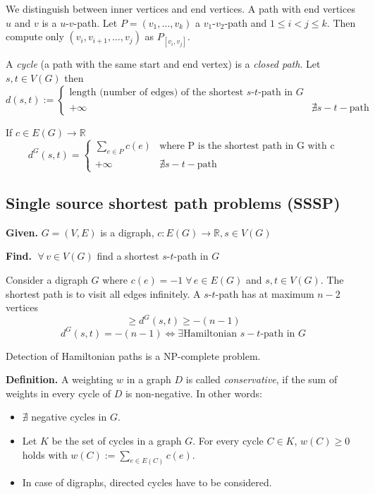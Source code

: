 \documentclass{article}
\newcommand{\given}[1]{\textbf{Given.} #1\par}
\newcommand{\find}[1]{\textbf{Find.} #1\par}
\newcommand{\gath}[2]{$#1$-$#2$-path} %
\newcommand{\fall}{\;\forall\,}
\begin{document}
We distinguish between inner vertices and end vertices. A path with end vertices $u$ and $v$ is a \gath uv. Let $P = (v_1, \ldots, v_k)$ a \gath{v_1}{v_2} and $1 \leq i < j \leq k$. Then compute only $(v_i, v_{i+1}, \ldots, v_j)$ as $P_{[v_i, v_j]}$.

A \emph{cycle} (a path with the same start and end vertex) is a \emph{closed path}. Let $s, t \in V(G)$ then
\[
  d(s, t) := \left\{\begin{array}{lc}
    \text{length (number of edges) of the shortest \gath st in $G$} & \\
    +\infty & \nexists s-t-\text{path}
  \end{array}\right.
\]

If $c \in E(G) \rightarrow \mathbb{R}$
\[
    d^G(s, t) = \left\{\begin{array}{lc}
      \sum_{e \in P} c(e) & \text{where P is the shortest path in G with c} \\
      +\infty & \nexists s-t-\text{path}
    \end{array}\right.
\]

\subsection{Single source shortest path problems (SSSP)}
%
\given{$G=(V,E)$ is a digraph, $c: E(G) \rightarrow \mathbb{R}, s \in V(G)$}
\find{$\fall v \in V(G)$ find a shortest \gath st in $G$}

Consider a digraph $G$ where $c(e) = -1 \fall e \in E(G)$ and $s,t \in V(G)$. The shortest path is to visit all edges infinitely. A \gath st has at maximum $n-2$ vertices
\[
    \geq d^G(s, t) \geq -(n - 1)
\] \[
    d^G(s, t) = -(n - 1) \Leftrightarrow \exists \text{Hamiltonian $s-t$-path in $G$}
\]

Detection of Hamiltonian paths is a NP-complete problem.

\textbf{Definition.}
  A weighting $w$ in a graph $D$ is called \emph{conservative}, if the sum of weights in every cycle of $D$ is non-negative. In other words:
  \begin{itemize}
    \item $\nexists$ negative cycles in $G$.
    \item Let $K$ be the set of cycles in a graph $G$. For every cycle $C \in K$, $w(C) \geq 0$ holds with $w(C) := \sum_{e \in E(C)} c(e)$.
    \item In case of digraphs, directed cycles have to be considered.
  \end{itemize}
\end{document}

